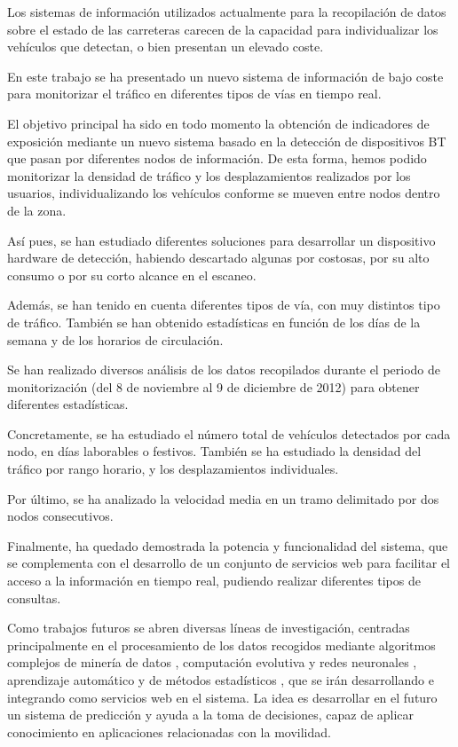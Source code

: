 \documentclass[twocolumn,twoside]{Jornadas}
\begin{document}

Los sistemas de información utilizados actualmente para la recopilación de datos sobre el estado de las carreteras carecen de la capacidad para individualizar los vehículos que detectan, o bien presentan un elevado coste.

En este trabajo se ha presentado un nuevo sistema de información de bajo coste para monitorizar el tráfico en diferentes tipos de vías en tiempo real.

El objetivo principal ha sido en todo momento la obtención de indicadores de exposición mediante un nuevo sistema basado en la detección de dispositivos BT que pasan por diferentes nodos de información.
De esta forma, hemos podido monitorizar la densidad de tráfico y los desplazamientos realizados por los usuarios, individualizando los vehículos conforme se mueven entre nodos dentro de la zona.

Así pues, se han estudiado diferentes soluciones para desarrollar un dispositivo hardware de detección, habiendo descartado algunas por costosas, por su alto consumo o por su corto alcance en el escaneo.

Además, se han tenido en cuenta diferentes tipos de vía, con muy distintos tipo de tráfico. 
También se han obtenido estadísticas en función de los días de la semana y de los horarios de circulación.


Se han realizado diversos análisis de los datos recopilados durante el periodo de monitorización (del 8 de noviembre al 9 de diciembre de 2012) para obtener diferentes estadísticas.

Concretamente, se ha estudiado el número total de vehículos detectados por cada nodo, en días laborables o festivos. También se ha estudiado la densidad del tráfico por rango horario, y los desplazamientos individuales.

Por último, se ha analizado la velocidad media en un tramo delimitado por dos nodos consecutivos.


Finalmente, ha quedado demostrada la potencia y funcionalidad del sistema, que se complementa con el desarrollo de un conjunto de servicios web para facilitar el acceso a la información en tiempo real, pudiendo realizar diferentes tipos de consultas.


Como trabajos futuros se abren diversas líneas de investigación, centradas principalmente en el procesamiento de los datos recogidos mediante algoritmos complejos de minería de datos \cite{Trevor2009}, computación evolutiva \cite{Eiben2003,Michalewicz2004,Yang2010} y redes neuronales \cite{Castillo2001,Rivas2003,Castillo2007}, aprendizaje automático \cite{Arenas2005} y de métodos estadísticos \cite{Jiawei2006,Hill2007,Nisbet2009}, que se irán desarrollando e integrando como servicios web \cite{Papazoglou2007,pgs2007} en el sistema.
La idea es desarrollar en el futuro un sistema de predicción y ayuda a la toma de decisiones, capaz de aplicar conocimiento en aplicaciones relacionadas con la movilidad. 
\end{document}
